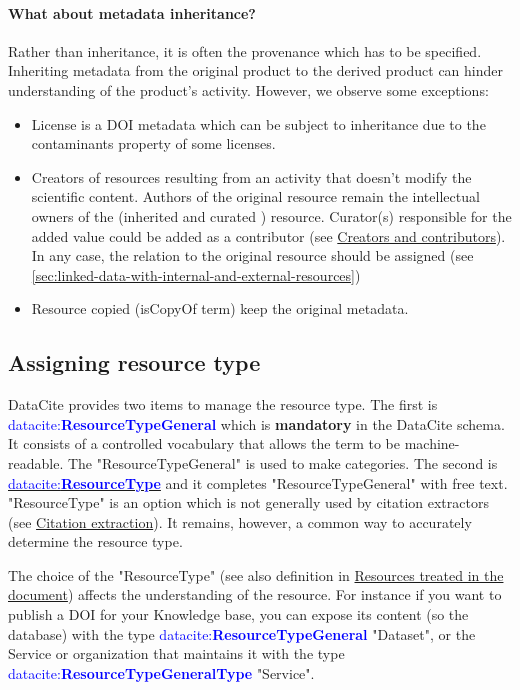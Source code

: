 \documentclass[11pt,a4paper]{ivoa}
\newcommand{\datacitedocurl}{https://datacite-metadata-schema.readthedocs.io/en/4.6}
\newcommand{\datacitepropurl}[1]{\datacitedocurl/properties/#1}
\newcommand{\dataciteterm}[1]{\textcolor{blue}{\mbox{datacite:\textbf{#1}}}}
\newcommand{\datacitetag}[2]{\href{\datacitepropurl{#1}}{\textcolor{blue}{\mbox{datacite:\textbf{#2}}}}}
\begin{document}
\paragraph{What about metadata inheritance?}

Rather than inheritance, it is often the provenance which has to be specified.\newline
Inheriting metadata from the original product to the derived product can hinder understanding of the product's activity. However, we observe some exceptions:

\begin{itemize}
\item{} License is a DOI metadata which can be subject to inheritance due to the contaminants property of some licenses.
\item{} Creators of resources resulting from an activity that doesn't modify the scientific content. \newline
Authors of the original resource remain the intellectual owners of the (inherited and curated ) resource. Curator(s) responsible for the added value could be added as a contributor (see \hyperlink{creators-and-contributors}{Creators and contributors}). In any case, the relation to the original resource should be assigned (see \ref{sec:linked-data-with-internal-and-external-resources})
\item{} Resource copied (isCopyOf term) keep the original metadata.
\end{itemize}

\subsection{Assigning resource type}\hypertarget{assigning-resource-type}{}\label{sec:assigning-resource-type}

DataCite provides two items to manage the resource type. \newline
The first is \dataciteterm{ResourceTypeGeneral} which is \textbf{mandatory} in the DataCite schema. It consists of a controlled vocabulary that allows the term to be machine-readable. The "ResourceTypeGeneral" is used to make categories. The second is \datacitetag{resourcetype}{ResourceType} and it completes "ResourceTypeGeneral" with free text. "ResourceType" is an option which is not generally used by citation extractors (see \hyperlink{citation-extraction}{Citation extraction}). It remains, however, a common way to accurately determine the resource type.

The choice of the "ResourceType" (see also definition in \hyperlink{resources-treated-in-the-document}{Resources treated in the document}) affects the understanding of the resource. %
For instance if you want to publish a DOI for your Knowledge base, you can expose its content (so the database) with the type \dataciteterm{ResourceTypeGeneral} "Dataset", or the Service or organization that maintains it with the type \dataciteterm{ResourceTypeGeneralType} "Service".\newline
\end{document}
